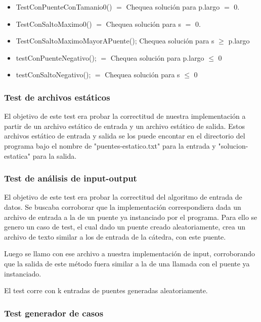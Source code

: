 \begin{itemize}
  \item TestConPuenteConTamanio0() $=$ Chequea soluci\'on para p.largo $=$ 0.
  \item 	TestConSaltoMaximo0() $=$ Chequea soluci\'on para s $=$ 0.
  \item TestConSaltoMaximoMayorAPuente(); Chequea soluci\'on para s $\geq$ p.largo 
  \item testConPuenteNegativo(); $=$ Chequea soluci\'on para p.largo $\leq$ 0
  \item testConSaltoNegativo(); $=$ Chequea soluci\'on para s $\leq$ 0
\end{itemize}

\subsubsection{Test de archivos est\'aticos}

El objetivo de este test era probar la correctitud de nuestra implementaci\'on a partir de un archivo est\'atico de entrada y un archivo est\'atico de salida.
Estos archivos est\'atico de entrada y salida se los puede encontar en el directorio del programa bajo el nombre de "puentes-estatico.txt" para la entrada y "solucion-estatica" para la salida.


\subsubsection{Test de an\'alisis de input-output}

El objetivo de este test era probar la correctitud del algoritmo de entrada de datos.
Se buscaba corroborar que la implementaci\'on correspondiera dada un archivo de entrada a la de un puente ya instanciado por el programa.
Para ello se genero un caso de test, el cual dado un puente creado aleatoriamente, crea un archivo de texto similar a los de entrada de la c\'atedra, con este puente. 

Luego se llamo con ese archivo a nuestra implementaci\'on de input, corroborando que la salida de este m\'etodo fuera similar a la de una llamada con el puente ya instanciado.

El test corre con k entradas de puentes generadas aleatoriamente.

\subsubsection{Test generador de casos}

